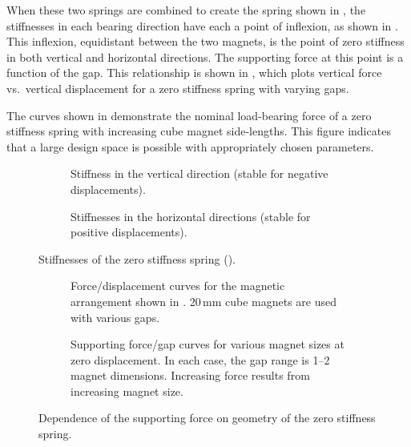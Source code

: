 When these two springs are combined to create the spring shown in
, the stiffnesses in each bearing direction
have each a point of inflexion, as shown in . This
inflexion, equidistant between the two magnets, is the point of zero
stiffness in both vertical and horizontal directions. The supporting
force at this point is a function of the gap. This relationship is
shown in , which plots vertical force
vs.\ vertical displacement for a zero stiffness spring with varying
gaps.

The curves shown in  demonstrate the
nominal load-bearing force of a zero stiffness spring with
increasing cube magnet side-lengths. This figure indicates that a
large design space is possible with appropriately chosen parameters.

\begin{figure}[p]
  \begin{subfigure}
    \caption{Stiffness in the vertical direction 
     (stable for negative displacements).}
   \end{subfigure}
  \hfill
  \begin{subfigure}
    \caption{Stiffnesses in the horizontal directions 
     (stable for positive displacements).}
  \end{subfigure}
  \caption{Stiffnesses of the zero stiffness spring ().}
\end{figure}

\begin{figure}
  \begin{subfigure}
    \caption{Force/displacement curves for the magnetic arrangement shown
        in . 20\,mm cube magnets
        are used with various gaps.
        }  
  \end{subfigure}
  \par
  \begin{subfigure}
    \caption{Supporting force/gap curves for various magnet sizes
     at zero displacement. In each case, the gap range is 1--2 magnet dimensions.
     Increasing force results from increasing magnet size.
     }   
  \end{subfigure}
     \caption{Dependence of the supporting force on geometry of the
       zero stiffness spring.}
\end{figure}

